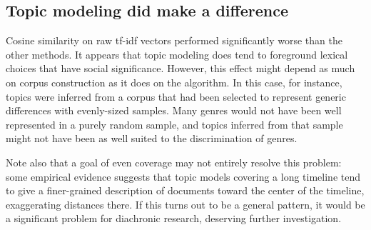 \documentclass[11pt]{article}
\begin{document}
\subsection{Topic modeling did make a difference}

Cosine similarity on raw tf-idf vectors performed significantly worse than the other methods. It appears that topic modeling does tend to foreground lexical choices that have social significance. However, this effect might depend as much on corpus construction as it does on the algorithm. In this case, for instance, topics were inferred from a corpus that had been selected to represent generic differences with evenly-sized samples. Many genres would not have been well represented in a purely random sample, and topics inferred from that sample might not have been as well suited to the discrimination of genres.

Note also that a goal of even coverage may not entirely resolve this problem: some empirical evidence suggests that topic models covering a long timeline tend to give a finer-grained description of documents toward the center of the timeline, exaggerating distances there. If this turns out to be a general pattern, it would be a significant problem for diachronic research, deserving further investigation.
\end{document}

